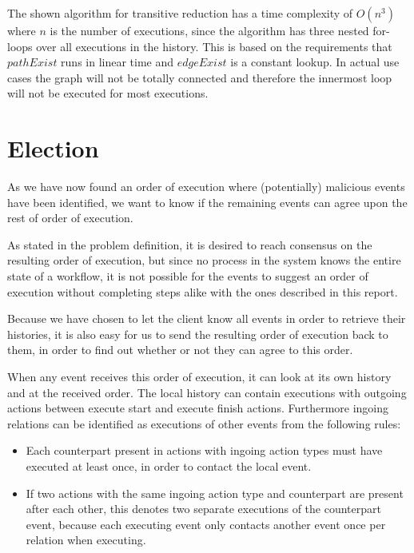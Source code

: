 	\newpar The shown algorithm for transitive reduction has a time complexity of $O(n^3)$ where $n$ is the number of executions, since the algorithm has three nested for-loops over all executions in the history. This is based on the requirements that $pathExist$ runs in linear time and $edgeExist$ is a constant lookup. In actual use cases the graph will not be totally connected and therefore the innermost loop will not be executed for most executions. 



	\section{Election} 
	As we have now found an order of execution where (potentially) malicious events have been identified, we want to know if the remaining events can agree upon the rest of order of execution.
	
	\newpar As stated in the problem definition, it is desired to reach consensus on the resulting order of execution, but since no process in the system knows the entire state of a workflow, it is not possible for the events to suggest an order of execution without completing steps alike with the ones described in this report.
	
	\newpar Because we have chosen to let the client know all events in order to retrieve their histories, it is also easy for us to send the resulting order of execution back to them, in order to find out whether or not they can agree to this order.
	
	\newpar When any event receives this order of execution, it can look at its own history and at the received order. The local history can contain executions with outgoing actions between execute start and execute finish actions. Furthermore ingoing relations can be identified as executions of other events from the following rules:
	
	\begin{itemize}
		\item Each counterpart present in actions with ingoing action types must have executed at least once, in order to contact the local event.
		\item If two actions with the same ingoing action type and counterpart are present after each other, this denotes two separate executions of the counterpart event, because each executing event only contacts another event once per relation when executing.
	\end{itemize}
	
